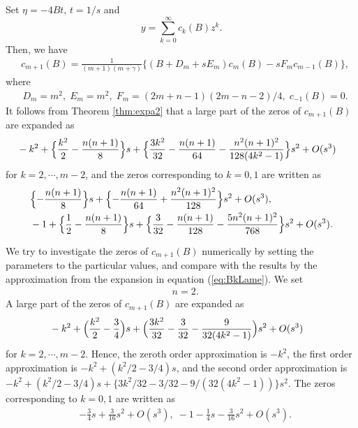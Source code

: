 \documentclass[12pt]{amsart}
\numberwithin{equation}{section}
\theoremstyle{definition}
\theoremstyle{remark}
\begin{document}
Set $\eta =-4 Bt$, $t=1/s$ and 
\begin{equation}
 y = \sum _{k=0}^{\infty } c_k (B)  z^k .
\end{equation}
Then, we have 
\begin{align}
& c_{m+1} (B) = \frac{1}{(m+1)(m+\gamma )} \{ (B+D_m +s E_m) c_{m} (B) -s F_m c_{m-1} (B) \} , 
\end{align}
where
\begin{align}
& D_{m}= m^2 ,\; E_{m}= m^2,  \; F_{m}= (2m+n-1)(2m-n-2)/4 , \; c_{-1} (B)=0. 
\end{align}
It follows from Theorem \ref{thm:expa2} that a large part of the zeros of $c_{m+1} (B) $ are expanded as
\begin{align}
& -k^2+ \Bigl\{ \frac{k^{2}}{2} -\frac{n(n+1)}{8} \Bigr\} s + \Bigl\{ \frac{3 k^{2}}{32} -\frac{n(n+1)}{64} - \frac{n^2(n+1)^2}{128(4 k^2 -1) }  \Bigr\} s^2 + O(s^3)
\label{eq:BkLame}
\end{align}
for $k= 2,\cdots, m-2  $, and the zeros corresponding to $k=0,1$ are written as
\begin{align}
&  \Bigl\{ -\frac{n(n+1)}{8} \Bigr\} s + \Bigl\{ -\frac{n(n+1)}{64} + \frac{n^2(n+1)^2}{128 } \Bigr\} s^2 + O(s^3) , \\
& -1 + \Bigl\{ \frac{1}{2} -\frac{n(n+1)}{8} \Bigr\} s + \Bigl\{ \frac{3 }{32} -\frac{n(n+1)}{128}  - \frac{5 n^2(n+1)^2}{768 }  \Bigr\} s^2 + O(s^3) .
\end{align}

We try to investigate the zeros of $c_{m+1} (B)$ numerically by setting the parameters to the particular values, and compare with the results by the approximation from the expansion in equation (\ref{eq:BkLame}).
We set
\begin{align}
& n=2.
\end{align}
A large part of the zeros of $c_{m+1} (B) $ are expanded as
\begin{align}
& -k^2+ \Bigl( \frac{k^{2}}{2} -\frac{3}{4} \Bigr) s + \Bigl( \frac{3 k^{2}}{32} -\frac{3}{32} - \frac{9}{32(4 k^2 -1) } \Bigr) s^2 + O(s^3)
\end{align}
for $k= 2,\cdots, m-2  $.
Hence, the zeroth order approximation is $-k^2$, the first order approximation is $-k^2+ (k^{2}/2 -3/4 ) s $, and the second order approximation is $-k^2+ (k^{2}/2 -3/4 ) s + \{ 3 k^{2}/32 - 3/32 - 9/(32(4 k^2 -1)) \} s^2 $.
The zeros corresponding to $k=0,1$ are written as
\begin{align}
& -\frac{3}{4}  s +  \frac{3}{16 }s^2 + O(s^3) , \;  -1  -\frac{1}{4} s - \frac{3 }{16} s^2 + O(s^3) .
\end{align}
\end{document}

